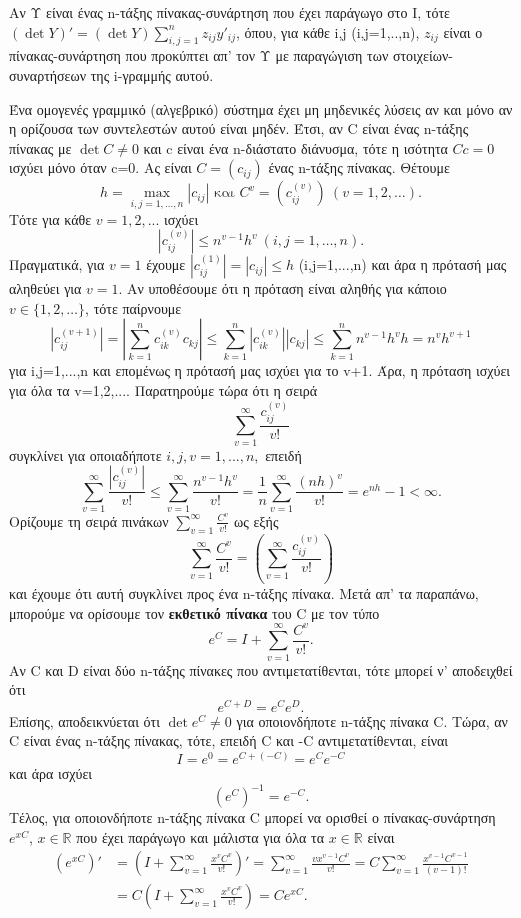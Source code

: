 \documentclass[11pt,a4paper,twoside]{book}
\begin{document}
Αν Υ είναι ένας n-τάξης πίνακας-συνάρτηση που έχει παράγωγο στο Ι, τότε $(\det Y)' = (\det Y) \sum_{i,j=1}^{n} z_{ij} y'_{ij}$, όπου, για κάθε i,j (i,j=1,..,n), $z_{ij}$ είναι ο πίνακας-συνάρτηση που προκύπτει απ' τον Υ με παραγώγιση των στοιχείων-συναρτήσεων της i-γραμμής αυτού.

Ένα ομογενές γραμμικό (αλγεβρικό) σύστημα έχει μη μηδενικές λύσεις αν και μόνο αν η ορίζουσα των συντελεστών αυτού είναι μηδέν. Έτσι, αν C είναι ένας n-τάξης πίνακας με $\det C \neq 0$ και c είναι ένα n-διάστατο διάνυσμα, τότε η ισότητα $Cc=0$ ισχύει μόνο όταν c=0. Ας είναι $C=(c_{ij})$ ένας n-τάξης πίνακας. Θέτουμε
\[
h = \max_{i,j=1,\dots,n} |c_{ij}| \text{ και } C^v = (c_{ij}^{(v)}) \ (v=1,2,\dots).
\]
Τότε για κάθε $v=1,2,...$ ισχύει
\[
|c_{ij}^{(v)}| \leq n^{v-1}h^v \ (i,j=1,\dots,n).
\]
Πραγματικά, για $v=1$ έχουμε $|c_{ij}^{(1)}| = |c_{ij}| \leq h$ (i,j=1,...,n) και άρα η πρότασή μας αληθεύει για $v=1$. Αν υποθέσουμε ότι η πρόταση είναι αληθής για κάποιο $v \in \{1,2,\dots\}$, τότε παίρνουμε
\[
|c_{ij}^{(v+1)}| = |\sum_{k=1}^{n} c_{ik}^{(v)} c_{kj}| \leq \sum_{k=1}^{n} |c_{ik}^{(v)}| |c_{kj}| \leq \sum_{k=1}^{n} n^{v-1}h^v h = n^v h^{v+1}
\]
για i,j=1,...,n και επομένως η πρότασή μας ισχύει για το v+1. Άρα, η πρόταση ισχύει για όλα τα v=1,2,.... Παρατηρούμε τώρα ότι η σειρά
\[
\sum_{v=1}^{\infty} \frac{c_{ij}^{(v)}}{v!}
\]
συγκλίνει για οποιαδήποτε $i,j,v=1,...,n,$ επειδή
\[
\sum_{v=1}^{\infty} \frac{|c_{ij}^{(v)}|}{v!} \leq \sum_{v=1}^{\infty} \frac{n^{v-1}h^v}{v!} = \frac{1}{n} \sum_{v=1}^{\infty} \frac{(nh)^v}{v!} = e^{nh}-1 < \infty.
\]
Ορίζουμε τη σειρά πινάκων $\sum_{v=1}^{\infty} \frac{C^v}{v!}$ ως εξής
\[
\sum_{v=1}^{\infty} \frac{C^v}{v!} = \left( \sum_{v=1}^{\infty} \frac{c_{ij}^{(v)}}{v!} \right)
\]
και έχουμε ότι αυτή συγκλίνει προς ένα n-τάξης πίνακα. Μετά απ' τα παραπάνω, μπορούμε να ορίσουμε τον \textbf{εκθετικό πίνακα} του C με τον τύπο
\[
e^C = I + \sum_{v=1}^{\infty} \frac{C^v}{v!}.
\]
Αν C και D είναι δύο n-τάξης πίνακες που αντιμετατίθενται, τότε μπορεί ν' αποδειχθεί ότι
\[
e^{C+D} = e^C e^D.
\]
Επίσης, αποδεικνύεται ότι $\det e^C \neq 0$ για οποιονδήποτε n-τάξης πίνακα C. Τώρα, αν C είναι ένας n-τάξης πίνακας, τότε, επειδή C και -C αντιμετατίθενται, είναι
\[
I = e^0 = e^{C+(-C)} = e^C e^{-C}
\]
και άρα ισχύει
\[
(e^C)^{-1} = e^{-C}.
\]
Τέλος, για οποιονδήποτε n-τάξης πίνακα C μπορεί να ορισθεί ο πίνακας-συνάρτηση $e^{xC}$, $x \in \mathbb{R}$ που έχει παράγωγο και μάλιστα για όλα τα $x \in \mathbb{R}$ είναι
\begin{align*}
(e^{xC})' &= \left( I + \sum_{v=1}^{\infty} \frac{x^v C^v}{v!} \right)' = \sum_{v=1}^{\infty} \frac{vx^{v-1}C^v}{v!} = C \sum_{v=1}^{\infty} \frac{x^{v-1}C^{v-1}}{(v-1)!} \\
&= C \left( I + \sum_{v=1}^{\infty} \frac{x^v C^v}{v!} \right) = C e^{xC}.
\end{align*}
\end{document}
